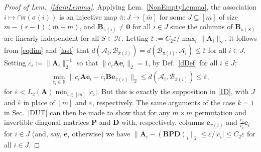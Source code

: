 \documentclass[journal, twocolumn]{IEEEtran}
\begin{document}
\begin{proof}[Proof of Lem.~\ref{MainLemma}]
Applying Lem.~\ref{NonEmptyLemma}, the association $i \mapsto \cap \pi(\sigma(i))$ is an injective map $\overline \pi: J \to [\overline m]$ for some $J \subseteq [m]$ of size $m - (r-1)(\overline m - m)$, and $\mathbf{B}_{\overline \pi(i)} \neq \mathbf{0}$ for all $i \in J$ since the columns of $\mathbf{B}_{\pi(S)}$ are linearly independent for all $S \in \mathcal{H}$. Letting $\overline \varepsilon := C_2 \varepsilon / \max_i \|\mathbf{A}_i\|_2$, it follows from \eqref{eqdim} and \eqref{last} that $d\left( \bm{\mathcal{A}}_i, \bm{\mathcal{B}}_{\overline \pi(i)} \right) = d\left(\bm{\mathcal{B}}_{\overline \pi(i)},  \bm{\mathcal{A}}_i \right)  \leq \overline \varepsilon$ for all $i \in J$. %
Setting $c_i := \|\mathbf{A}_i\|_2^{-1}$ so that $\|c_i\mathbf{Ae}_i\|_2 = 1$, by Def.~\ref{dDef} for all $i \in J$:
\begin{align*}
\min_{\overline c_i \in \mathbb{R}} \|c_i\mathbf{Ae}_i - \overline c_i \mathbf{Be}_{\overline \pi(i)} \|_2
\leq d\left( \bm{\mathcal{A}}_i, \bm{\mathcal{B}}_{\overline \pi(i)} \right)
\leq \overline \varepsilon,
\end{align*}
%
for $\overline \varepsilon < L_2(\mathbf{A})\min_{i \in [m]}|c_i|$. But this is exactly the supposition in \eqref{1D}, with $J$ and $\overline \varepsilon$ in place of $[m]$ and $\varepsilon$, respectively. The same arguments of the case $k=1$ in Sec.~\ref{DUT} can then be made to show that for any $\overline m \times \overline m$ permutation and invertible diagonal matrices $\mathbf{P}$ and $\mathbf{D}$ with, respectively, columns $\mathbf{e}_{\pi(i)}$ and $\frac{\overline{c}_i}{c_i}\mathbf{e}_i$ for $i \in J$ (and, say, $\mathbf{e}_i$ otherwise) we have $\|\mathbf{A}_i - (\mathbf{B}\mathbf{PD})_i \|_2 \leq \overline  \varepsilon / |c_i|  \leq C_2 \varepsilon$ for all $i \in J$.
\end{proof}
\end{document}
